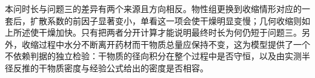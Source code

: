 本问时长与问题三的差异有两个来源且方向相反。物性组更换到收缩情形对应的一套后，扩散系数的前因子显著变小，单看这一项会使干燥明显变慢；几何收缩则如上所述使干燥加快。只有把两者分开计算才能说明最终时长为何仍短于问题三。另外，收缩过程中水分不断离开药材而干物质总量应保持不变，这为模型提供了一个不依赖判据的独立检验：干物质的径向积分在整个过程中是否守恒，以及由实测半径反推的干物质密度与经验公式给出的密度是否相容。
